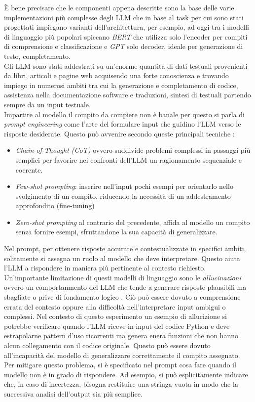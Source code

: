 \documentclass{article}
\begin{document}
È bene precisare che le componenti appena descritte sono la base delle varie implementazioni più complesse degli LLM che in base al task per cui sono stati progettati impiegano varianti dell'architettura, per esempio, ad oggi tra i modelli di linguaggio più popolari spiccano \textit{BERT} \cite{devlin2019bertpretrainingdeepbidirectional} che utilizza solo l'encoder per compiti di comprensione e classificazione e \textit{GPT}\cite{radford2018improving} solo decoder, ideale per generazione di testo, completamento.\\
Gli LLM sono stati addestrati su un'enorme quantità di dati testuali provenienti da libri, articoli e pagine web acquisendo una forte conoscienza e trovando impiego in numerosi ambiti tra cui la generazione e completamento di codice, assistenza nella documentazione software e traduzioni, sintesi di testuali \cite{di2025use} partendo sempre da un input testuale.\\
Impartire al modello il compito da compiere non è banale per questo si parla di \textit{prompt engineering} come l'arte del formulare input che guidino l'LLM verso le risposte desiderate. Questo può avvenire secondo queste principali tecniche \cite{di2025use}:
\begin{itemize}
    \item \textit{Chain-of-Thought (CoT)} ovvero suddivide problemi complessi in passaggi più semplici per favorire nei confronti dell'LLM un ragionamento sequenziale e coerente.
    \item \textit{Few-shot prompting}: inserire nell'input pochi esempi per orientarlo nello svolgimento di un compito, riducendo la necessità di un addestramento approfondito (fine-tuning)
    \item \textit{Zero-shot prompting} al contrario del precedente, affida al modello un compito senza fornire esempi, sfruttandone la sua capacità di generalizzare.
\end{itemize}
Nel prompt, per ottenere risposte accurate e contestualizzate in specifici ambiti, solitamente si assegna un ruolo al modello che deve interpretare. Questo aiuta l'LLM a rispondere in maniera più pertinente al contesto richiesto.\\
Un'importante limitazione di questi modelli di linguaggio sono le \textit{allucinazioni} ovvero un comportanmento del LLM che tende a generare risposte plausibili ma sbagliate o prive di fondamento logico \cite{di2025use}. Ciò può essere dovuto a comprensione errata del contesto oppure alla difficoltà nell’interpretare input ambigui o complessi. Nel contesto di questo esperimento un esempio di allucizione si potrebbe verificare quando l'LLM riceve in input del codice Python e deve estrapolarne pattern d'uso ricorrenti ma genera enera funzioni che non hanno alcun collegamento con il codice originale. Questo può essere dovuto all’incapacità del modello di generalizzare correttamente il compito assegnato. Per mitigare questo problema, si è specificato nel prompt cosa fare quando il modello non è in grado di rispondere. Ad esempio, si può esplicitamente indicare che, in caso di incertezza, bisogna restituire una stringa vuota in modo che la successiva analisi dell'output sia più semplice.
\end{document}
